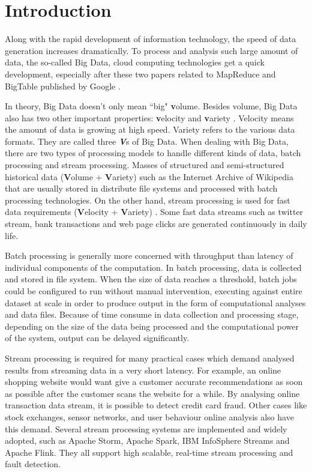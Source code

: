 \chapter{Introduction}
\label{chapter:intro}

Along with the rapid development of information technology, the speed of data generation increases dramatically. To process and analysis such large amount of data, the so-called Big Data, cloud computing technologies get a quick development, especially after these two papers related to MapReduce and BigTable published by Google \cite{chang2006bigtable, dean2008mapreduce}.

In theory, Big Data doesn't only mean ``big" \textbf{v}olume. Besides volume, Big Data also has two other important properties: \textbf{v}elocity and \textbf{v}ariety \cite{doug2001data}. Velocity means the amount of data is growing at high speed. Variety refers to the various data formats. They are called three \textbf{\textit{V}}s of Big Data.  When dealing with Big Data, there are two types of processing models to handle different kinds of data, batch processing and stream processing. Masses of structured and semi-structured historical data (\textbf{V}olume + \textbf{V}ariety) such as the Internet Archive of Wikipedia that are usually stored in distribute file systems and processed with batch processing technologies. On the other hand, stream processing is used for fast data requirements (\textbf{V}elocity + \textbf{V}ariety) \cite{GameChanger}. Some fast data streams such as twitter stream, bank transactions and web page clicks are generated continuously in daily life.

Batch processing is generally more concerned with throughput than latency of individual components of the computation. In batch processing, data is collected and stored in file system. When the size of data reaches a threshold, batch jobs could be configured to run without manual intervention, executing against entire dataset at scale in order to produce output in the form of computational analyses and data files. Because of time consume in data collection and processing stage, depending on the size of the data being processed and the computational power of the system, output can be delayed significantly.

Stream processing is required for many practical cases which demand analysed results from streaming data in a very short latency. For example, an online shopping website would want give a customer accurate recommendations as soon as possible after the customer scans the website for a while. By analysing online transaction data stream, it is possible to detect credit card fraud. Other cases like stock exchanges, sensor networks, and user behaviour online analysis also have this demand. Several stream processing systems are implemented and widely adopted, such as Apache Storm, Apache Spark, IBM InfoSphere Streams and Apache Flink. They all support high scalable, real-time stream processing and fault detection. 


